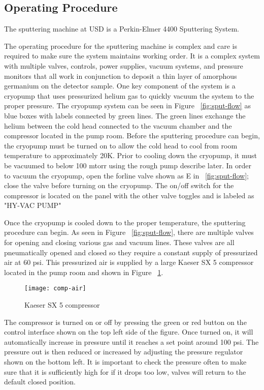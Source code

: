 \subsection{Operating Procedure}
The sputtering machine at USD is a Perkin-Elmer 4400 Sputtering System.

The operating procedure for the sputtering machine is complex and care is required to make sure the system maintains working order.
It is a complex system with multiple valves, controls, power supplies, vacuum systems, and pressure monitors that all work in conjunction to deposit a thin layer of amorphous germanium on the detector sample.
One key component of the system is a cryopump that uses pressurized helium gas to quickly vacuum the system to the proper pressure.
The cryopump system can be seen in Figure ~\ref{fig:sput-flow} as blue boxes with labels connected by green lines.
The green lines exchange the helium between the cold head connected to the vacuum chamber and the compressor located in the pump room.
Before the sputtering procedure can begin, the cryopump must be turned on to allow the cold head to cool from room temperature to approximately 20K.
Prior to cooling down the cryopump, it must be vacuumed to below 100 mtorr using the rough pump describe later.
In order to vacuum the cryopump, open the forline valve shown as E in ~\ref{fig:sput-flow}; close the valve before turning on the cryopump.
The on/off switch for the compressor is located on the panel with the other valve toggles and is labeled as "HY-VAC PUMP"

Once the cryopump is cooled down to the proper temperature, the sputtering procedure can begin.
As seen in Figure ~\ref{fig:sput-flow}, there are multiple valves for opening and closing various gas and vacuum lines.
These valves are all pneumatically opened and closed so they require a constant supply of pressurized air at 60 psi.
This pressurized air is supplied by a large Kaeser SX 5 compressor located in the pump room and shown in Figure ~\ref{fig:comp-air}.
\begin{figure}[htpb]
\centering
\texttt{[image: comp-air]}
\caption{Kaeser SX 5 compressor}
\label{fig:comp-air}
\end{figure}
The compressor is turned on or off by pressing the green or red button on the control interface shown on the top left side of the figure.
Once turned on, it will automatically increase in pressure until it reaches a set point around 100 psi.
The pressure out is then reduced or increased by adjusting the pressure regulator shown on the bottom left.
It is important to check the pressure often to make sure that it is sufficiently high for if it drops too low, valves will return to the default closed position.

